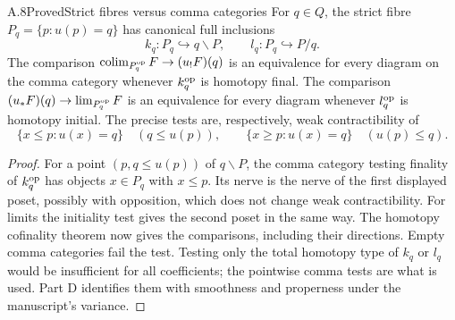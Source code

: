 \begin{statement}{A.8}{Proved}{Strict fibres versus comma categories}
For $q\in Q$, the strict fibre $P_q=\{p:u(p)=q\}$ has canonical full
inclusions
\[
 k_q:P_q\hookrightarrow q\backslash P,\qquad
 l_q:P_q\hookrightarrow P/q.
\]
The comparison
$\operatorname*{colim}_{P_q^{\mathrm{op}}}F\to(u_!F)(q)$ is an equivalence for every diagram
on the comma category whenever $k_q^{\mathrm{op}}$ is homotopy final. The
comparison $(u_*F)(q)\to\operatorname*{lim}_{P_q^{\mathrm{op}}}F$ is an equivalence for
every diagram whenever $l_q^{\mathrm{op}}$ is homotopy initial.
The precise tests are, respectively, weak contractibility of
\[
 \{x\leq p:u(x)=q\}\quad(q\leq u(p)),\qquad
 \{x\geq p:u(x)=q\}\quad(u(p)\leq q).
\tag{A.8}
\]
\end{statement}
\begin{proof}
For a point $(p,q\leq u(p))$ of $q\backslash P$, the comma category
testing finality of $k_q^{\mathrm{op}}$ has objects $x\in P_q$ with $x\leq p$.
Its nerve is the nerve of the first displayed poset, possibly with
opposition, which does not change weak contractibility. For limits the
initiality test gives the second poset in the same way. The homotopy
cofinality theorem now gives the comparisons, including their directions.
Empty comma categories fail the test. Testing only the total homotopy
type of $k_q$ or $l_q$ would be insufficient for all coefficients; the
pointwise comma tests are what is used. Part D identifies them with
smoothness and properness under the manuscript's variance.
\end{proof}

